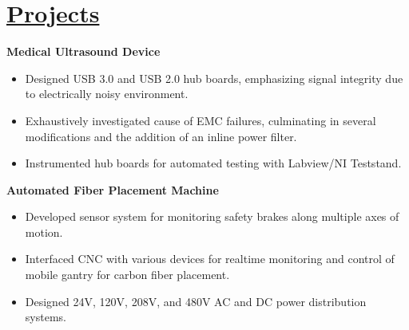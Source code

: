 \documentclass[a4paper, 11pt]{article}
\begin{document}
\section{\underline{Projects}}
  \textbf{Medical Ultrasound Device}
  \begin{itemize}[nosep]
    \item Designed USB 3.0 and USB 2.0 hub boards, emphasizing signal integrity due to electrically noisy environment.
    \item Exhaustively investigated cause of EMC failures, culminating in several modifications and the addition of an inline power filter.
    \item Instrumented hub boards for automated testing with Labview/NI Teststand.
  \end{itemize}
  \bigskip
  
  \textbf{Automated Fiber Placement Machine}
  \begin{itemize}[nosep]
    \item Developed sensor system for monitoring safety brakes along multiple axes of motion.
    \item Interfaced CNC with various devices for realtime monitoring and control of mobile gantry for carbon fiber placement.
    \item Designed 24V, 120V, 208V, and 480V AC and DC power distribution systems.
  \end{itemize}
\end{document}
